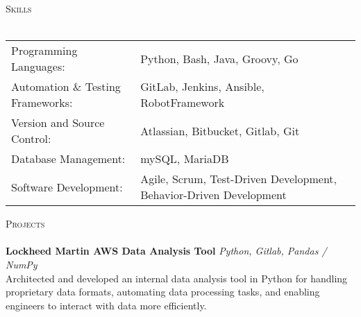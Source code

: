 \documentclass[letterpaper,11pt]{article}
\newcommand{\lineunder} {
    \vspace*{-8pt} \\
    \hspace*{-18pt} \hrulefill \\
}
\newcommand{\header} [1] {
    {\hspace*{-18pt}\vspace*{6pt} \textsc{#1}}
    \vspace*{-6pt} \lineunder
}
\begin{document}
\header{Skills}
\begin{tabular}{ l l }
	Programming Languages:            & Python, Bash, Java, Groovy, Go                                     \\
	Automation \& Testing Frameworks: & GitLab, Jenkins, Ansible, RobotFramework                           \\
	Version and Source Control:       & Atlassian, Bitbucket, Gitlab, Git                                  \\
	Database Management:              & mySQL, MariaDB                                                     \\
   Software Development:             & Agile, Scrum, Test-Driven Development, Behavior-Driven Development \\
\end{tabular}
\vspace{2mm}

\header{Projects}
{\textbf{Lockheed Martin AWS Data Analysis Tool}} {\sl Python, Gitlab, Pandas / NumPy} \\
Architected and developed an internal data analysis tool in Python for handling proprietary data formats, automating data processing tasks, and enabling engineers to interact with data more efficiently.\\
\vspace*{2mm}



\ 
\end{document}
